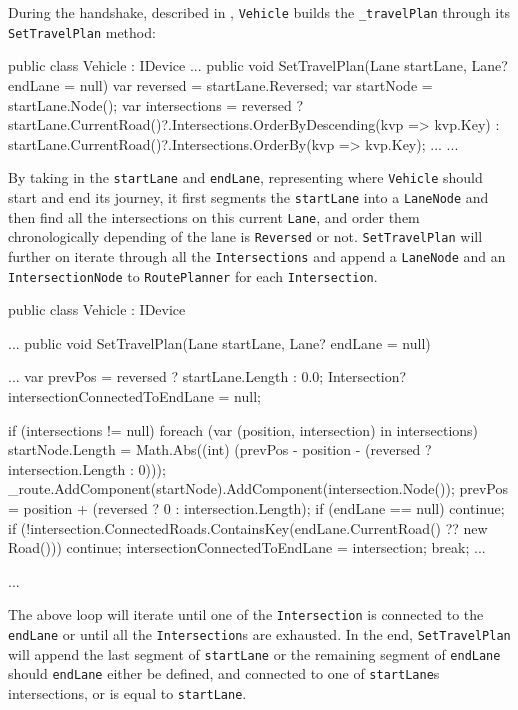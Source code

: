 During the handshake, described in , \verb|Vehicle| builds the \verb|_travelPlan| through its \verb|SetTravelPlan| method:
\begin{csharp}
public class Vehicle : IDevice
{
	...
	public void SetTravelPlan(Lane startLane, Lane? endLane = null)
	{
		var reversed = startLane.Reversed;
		var startNode = startLane.Node();
		var intersections = 
			reversed ? 
				startLane.CurrentRoad()?.Intersections.OrderByDescending(kvp => kvp.Key) : 
				startLane.CurrentRoad()?.Intersections.OrderBy(kvp => kvp.Key);
		...
	}
	...
}
\end{csharp}
By taking in the \verb*|startLane| and \verb*|endLane|, representing where \verb*|Vehicle| should start and end its journey, it first segments the \verb*|startLane| into a \verb*|LaneNode| and then find all the intersections on this current \verb*|Lane|, and order them chronologically depending of the lane is \verb*|Reversed| or not. \verb|SetTravelPlan| will further on iterate through all the \verb*|Intersections| and append a \verb|LaneNode| and an \verb|IntersectionNode| to \verb|RoutePlanner| for each \verb*|Intersection|.
\begin{csharp}
public class Vehicle : IDevice
{
	...
	public void SetTravelPlan(Lane startLane, Lane? endLane = null)
	{
		...
		var prevPos = reversed ? startLane.Length : 0.0;
		Intersection? intersectionConnectedToEndLane = null;
		
		if (intersections != null)
			foreach (var (position, intersection) in intersections)
			{
				startNode.Length = Math.Abs((int) (prevPos - position - (reversed ? intersection.Length : 0)));
				_route.AddComponent(startNode).AddComponent(intersection.Node());
				prevPos = position + (reversed ? 0 : intersection.Length);
				if (endLane == null) continue;
				if (!intersection.ConnectedRoads.ContainsKey(endLane.CurrentRoad() ?? new Road())) continue;
				intersectionConnectedToEndLane = intersection;
				break;
			}
		...
	}
	...
}
\end{csharp}
The above loop will iterate until one of the \verb*|Intersection| is connected to the \verb*|endLane| or until all the \verb*|Intersection|s are exhausted. In the end, \verb*|SetTravelPlan| will append the last segment of \verb*|startLane| or the remaining segment of \verb*|endLane| should \verb*|endLane| either be defined, and connected to one of \verb*|startLane|s intersections, or is equal to \verb*|startLane|.

